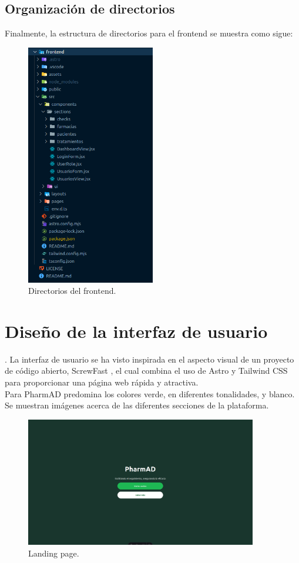 \subsection{Organización de directorios} Finalmente, la estructura de directorios para el frontend se muestra como sigue:
\begin{figure}[h!]
	\centering
	\includegraphics[width=0.5\textwidth]{imagenes/orgfront.png}
	\caption{Directorios del frontend.}
\end{figure}

\newpage
\section{Diseño de la interfaz de usuario}.
La interfaz de usuario se ha visto inspirada en el aspecto visual de un proyecto de código abierto, ScrewFast \cite{screwfast}, el cual combina el uso de Astro y Tailwind CSS para proporcionar una página web rápida y atractiva. \\

Para PharmAD predomina los colores verde, en diferentes tonalidades, y blanco. Se muestran imágenes acerca de las diferentes secciones de la plataforma.


\begin{figure}[h!]
	\centering
	\includegraphics[width=0.9\textwidth]{imagenes/landing.png}
	\caption{Landing page.}
\end{figure}

